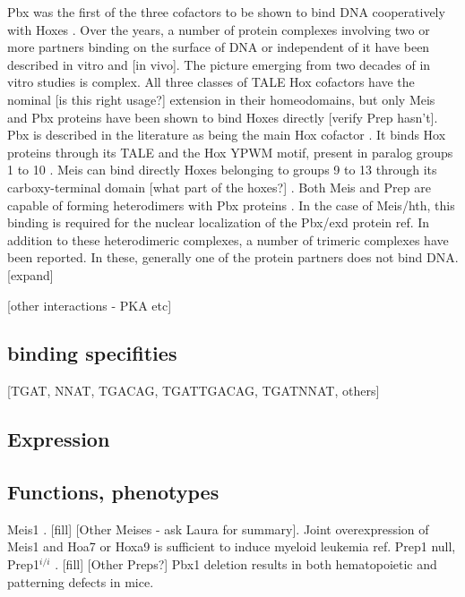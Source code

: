 		Pbx was the first of the three cofactors to be shown to bind DNA cooperatively with Hoxes \cite{ref}. Over the years, a number of protein complexes involving two or more partners binding on the surface of DNA or independent of it have been described in vitro and [in vivo]. The picture emerging from two decades of in vitro studies is complex. 
		All three classes of TALE Hox cofactors have the nominal [is this right usage?] extension in their homeodomains, but only Meis and Pbx proteins have been shown to bind Hoxes directly [verify Prep hasn't]. Pbx is described in the literature as being the main Hox cofactor \cite{ref}. It binds Hox proteins through its TALE and the Hox YPWM motif, present in paralog groups 1 to 10 \cite{refs, Passner1999}. Meis can bind directly Hoxes belonging to groups 9 to 13 through its carboxy-terminal domain [what part of the hoxes?] \cite{ref}. 
		Both Meis and Prep are capable of forming heterodimers with Pbx proteins \cite{ref}. In the case of Meis/hth, this binding is required for the nuclear localization of the Pbx/exd protein {ref}. 
		In addition to these heterodimeric complexes, a number of trimeric complexes have been reported. In these, generally one of the protein partners does not bind DNA. [expand]

		[other interactions - PKA etc]

\subsection{binding specifities}
		
		
		
		[TGAT, NNAT, TGACAG, TGATTGACAG, TGATNNAT, others]

\subsection{Expression}
\subsection{Functions, phenotypes}

		Meis1  \cite{Azcoitia2005, Carramolino2010}. [fill] [Other Meises - ask Laura for summary]. Joint overexpression of Meis1 and Hoa7 or Hoxa9 is sufficient to induce myeloid leukemia {ref}.
		Prep1 null, Prep1$^{i/i}$ \cite{Ferretti2006, Fernandez-Diaz2010, Longobardi2010}. [fill] [Other Preps?]
		Pbx1 deletion results in both hematopoietic \cite{DiMartino2001} and patterning \cite{Selleri et al. 2001} defects in mice.

